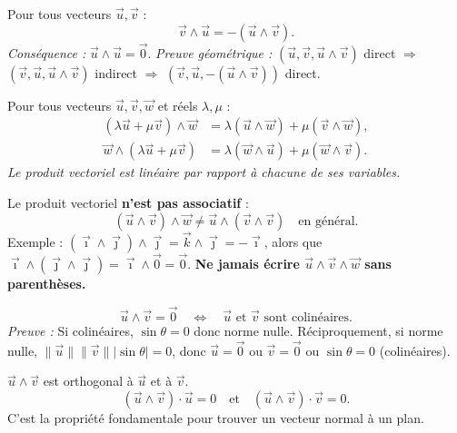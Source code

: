 \documentclass[11pt]{article}
\newcommand{\cle}[1]{{\popxbold\color{popdark}#1}}
\begin{document}
\begin{propriete}[Antisymétrie]
Pour tous vecteurs $\vec{u},\vec{v}$ :
\[
\vec{v}\wedge\vec{u} = -(\vec{u}\wedge\vec{v}).
\]
\emph{Conséquence :} $\vec{u}\wedge\vec{u}=\vec{0}$.
\emph{Preuve géométrique :} $(\vec{u},\vec{v},\vec{u}\wedge\vec{v})$ direct $\Rightarrow$ $(\vec{v},\vec{u},\vec{u}\wedge\vec{v})$ indirect $\Rightarrow$ $(\vec{v},\vec{u},-(\vec{u}\wedge\vec{v}))$ direct.
\end{propriete}

\begin{propriete}[Bilinéarité]
Pour tous vecteurs $\vec{u},\vec{v},\vec{w}$ et réels $\lambda,\mu$ :
\begin{align*}
(\lambda\vec{u}+\mu\vec{v})\wedge\vec{w} &= \lambda(\vec{u}\wedge\vec{w}) + \mu(\vec{v}\wedge\vec{w}), \\
\vec{w}\wedge(\lambda\vec{u}+\mu\vec{v}) &= \lambda(\vec{w}\wedge\vec{u}) + \mu(\vec{w}\wedge\vec{v}).
\end{align*}
\emph{Le produit vectoriel est linéaire par rapport à chacune de ses variables.}
\end{propriete}

\begin{attention}
Le produit vectoriel \textbf{n'est pas associatif} :
\[
(\vec{u}\wedge\vec{v})\wedge\vec{w} \neq \vec{u}\wedge(\vec{v}\wedge\vec{v}) \quad \text{en général}.
\]
Exemple : $(\vec{\imath}\wedge\vec{\jmath})\wedge\vec{\jmath} = \vec{k}\wedge\vec{\jmath} = -\vec{\imath}$, alors que $\vec{\imath}\wedge(\vec{\jmath}\wedge\vec{\jmath}) = \vec{\imath}\wedge\vec{0} = \vec{0}$.
\textbf{Ne jamais écrire $\vec{u}\wedge\vec{v}\wedge\vec{w}$ sans parenthèses.}
\end{attention}

\begin{propriete}
\[
\vec{u}\wedge\vec{v} = \vec{0} \quad\Longleftrightarrow\quad \vec{u} \text{ et } \vec{v} \text{ sont colinéaires}.
\]
\emph{Preuve :} Si colinéaires, $\sin\theta=0$ donc norme nulle. Réciproquement, si norme nulle, $\|\vec{u}\|\|\vec{v}\||\sin\theta|=0$, donc $\vec{u}=\vec{0}$ ou $\vec{v}=\vec{0}$ ou $\sin\theta=0$ (colinéaires).
\end{propriete}

\begin{propriete}[Orthogonalité]
$\vec{u}\wedge\vec{v}$ est orthogonal à $\vec{u}$ et à $\vec{v}$.
\[
(\vec{u}\wedge\vec{v})\cdot\vec{u} = 0 \quad\text{et}\quad (\vec{u}\wedge\vec{v})\cdot\vec{v} = 0.
\]
C'est la propriété fondamentale pour trouver un \cle{vecteur normal} à un plan.
\end{propriete}
\end{document}
